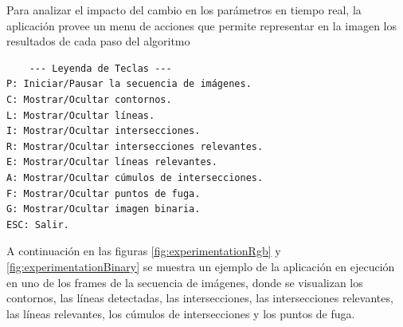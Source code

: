 Para analizar el impacto del cambio en los parámetros en tiempo real, la aplicación provee un menu de acciones que permite
representar en la imagen los resultados de cada paso del algoritmo

\begin{verbatim}
    --- Leyenda de Teclas ---
P: Iniciar/Pausar la secuencia de imágenes.
C: Mostrar/Ocultar contornos.
L: Mostrar/Ocultar líneas.
I: Mostrar/Ocultar intersecciones.
R: Mostrar/Ocultar intersecciones relevantes.
E: Mostrar/Ocultar líneas relevantes.
A: Mostrar/Ocultar cúmulos de intersecciones.
F: Mostrar/Ocultar puntos de fuga.
G: Mostrar/Ocultar imagen binaria.
ESC: Salir.
\end{verbatim}
\noindent
A continuación  en las figuras \ref{fig:experimentationRgb} y \ref{fig:experimentationBinary} se muestra un ejemplo de la aplicación
en ejecución en uno de los frames de la secuencia de imágenes,
donde se visualizan los contornos, las líneas detectadas, las intersecciones, las intersecciones relevantes, las líneas relevantes,
los cúmulos de intersecciones y los puntos de fuga.

